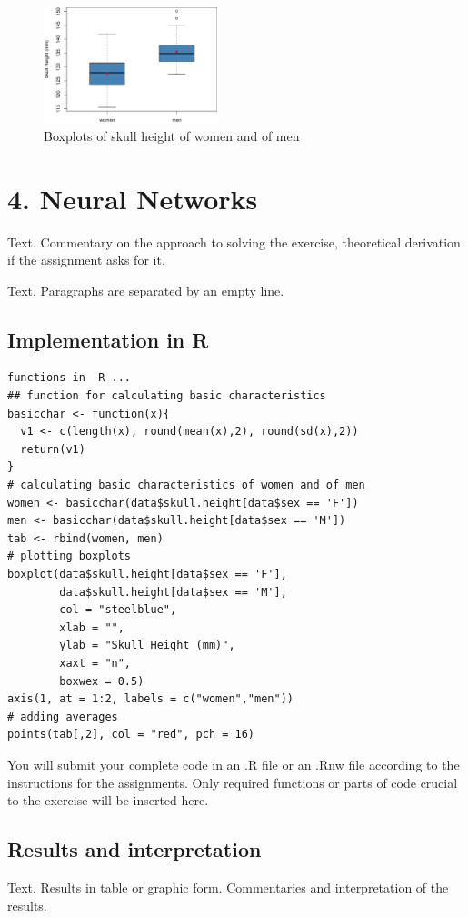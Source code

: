 \begin{figure}[ht]
\centering
\includegraphics[angle=0,width=0.45\textwidth]{boxplot-example.pdf}
\caption{Boxplots of skull height of women and of men}
\end{figure}

\newpage

\section*{4. Neural Networks}
\noindent Text. Commentary on the approach to solving the exercise, theoretical derivation if the assignment asks for it.

Text. Paragraphs are separated by an empty line. 

\subsection*{Implementation in R}
\begin{lstlisting}
functions in  R ...
## function for calculating basic characteristics
basicchar <- function(x){
  v1 <- c(length(x), round(mean(x),2), round(sd(x),2))
  return(v1)
}
# calculating basic characteristics of women and of men
women <- basicchar(data$skull.height[data$sex == 'F'])
men <- basicchar(data$skull.height[data$sex == 'M'])
tab <- rbind(women, men)
# plotting boxplots
boxplot(data$skull.height[data$sex == 'F'], 
        data$skull.height[data$sex == 'M'],
        col = "steelblue", 
        xlab = "",
        ylab = "Skull Height (mm)",
        xaxt = "n", 
        boxwex = 0.5)
axis(1, at = 1:2, labels = c("women","men"))
# adding averages
points(tab[,2], col = "red", pch = 16)
\end{lstlisting}

You will submit your complete code in an \textsf{.R} file or an \textsf{.Rnw} file according to the instructions for the assignments. Only required functions or parts of code crucial to the exercise will be inserted here.
\bigskip
\subsection*{Results and interpretation}
\noindent Text. Results in table or graphic form. Commentaries and interpretation of the results.

